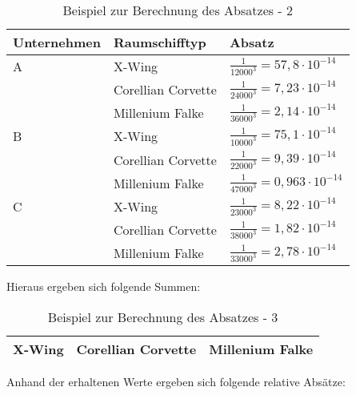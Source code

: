 \begin{table}[ht]
     \centering
     \begin{tabular}{ | l | l | l | }
          \hline
          Unternehmen & Raumschifftyp & Absatz \\
          \hline \hline
         A & X-Wing & $\frac{1}{12000^3} = 57,8 \cdot 10^{-14}$  \\
           & Corellian Corvette & $\frac{1}{24000^3} = 7,23 \cdot 10^{-14}$ \\
           & Millenium Falke & $\frac{1}{36000^3} = 2,14 \cdot 10^{-14}$ \\ \hline
         B & X-Wing & $\frac{1}{10000^3} = 75,1 \cdot 10^{-14}$ \\
           & Corellian Corvette & $\frac{1}{22000^3} = 9,39 \cdot 10^{-14}$ \\
           & Millenium Falke & $\frac{1}{47000^3} = 0,963 \cdot 10^{-14}$ \\ \hline
         C & X-Wing & $\frac{1}{23000^3} = 8,22 \cdot 10^{-14}$ \\
           & Corellian Corvette & $\frac{1}{38000^3} = 1,82 \cdot 10^{-14}$ \\
           & Millenium Falke & $\frac{1}{33000^3} = 2,78 \cdot 10^{-14}$ \\ \hline
     \end{tabular}
     \caption{Beispiel zur Berechnung des Absatzes - 2}
     \label{tab:spielwelt-logik-absatzmengen-beispiel2}
\end{table}
 
 Hieraus ergeben sich folgende Summen:
 
\begin{table}[ht]
     \centering
     \begin{tabular}{ | l | l | l | }
          \hline
          X-Wing & Corellian Corvette & Millenium Falke \\
          \hline \hline
          
     \end{tabular}
     \caption{Beispiel zur Berechnung des Absatzes - 3}
     \label{tab:spielwelt-logik-absatzmengen-beispiel3}
\end{table} 

Anhand der erhaltenen Werte ergeben sich folgende relative Absätze:

